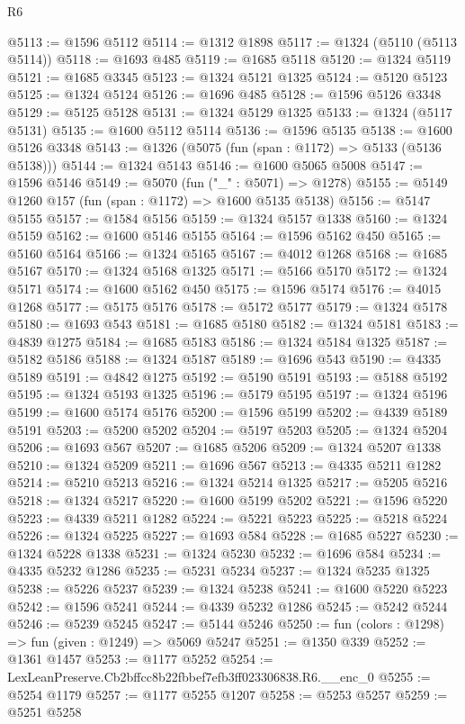 \begin{lexlean}{R6}
\begin{coremodule}
@5113 := @1596 @5112
@5114 := @1312 @1898
@5117 := @1324 (@5110 (@5113 @5114))
@5118 := @1693 @485
@5119 := @1685 @5118
@5120 := @1324 @5119
@5121 := @1685 @3345
@5123 := @1324 @5121 @1325
@5124 := @5120 @5123
@5125 := @1324 @5124
@5126 := @1696 @485
@5128 := @1596 @5126 @3348
@5129 := @5125 @5128
@5131 := @1324 @5129 @1325
@5133 := @1324 (@5117 @5131)
@5135 := @1600 @5112 @5114
@5136 := @1596 @5135
@5138 := @1600 @5126 @3348
@5143 := @1326 (@5075 (fun (span : @1172) => @5133 (@5136 @5138)))
@5144 := @1324 @5143
@5146 := @1600 @5065 @5008
@5147 := @1596 @5146
@5149 := @5070 (fun ("_" : @5071) => @1278)
@5155 := @5149 @1260 @157 (fun (span : @1172) => @1600 @5135 @5138)
@5156 := @5147 @5155
@5157 := @1584 @5156
@5159 := @1324 @5157 @1338
@5160 := @1324 @5159
@5162 := @1600 @5146 @5155
@5164 := @1596 @5162 @450
@5165 := @5160 @5164
@5166 := @1324 @5165
@5167 := @4012 @1268
@5168 := @1685 @5167
@5170 := @1324 @5168 @1325
@5171 := @5166 @5170
@5172 := @1324 @5171
@5174 := @1600 @5162 @450
@5175 := @1596 @5174
@5176 := @4015 @1268
@5177 := @5175 @5176
@5178 := @5172 @5177
@5179 := @1324 @5178
@5180 := @1693 @543
@5181 := @1685 @5180
@5182 := @1324 @5181
@5183 := @4839 @1275
@5184 := @1685 @5183
@5186 := @1324 @5184 @1325
@5187 := @5182 @5186
@5188 := @1324 @5187
@5189 := @1696 @543
@5190 := @4335 @5189
@5191 := @4842 @1275
@5192 := @5190 @5191
@5193 := @5188 @5192
@5195 := @1324 @5193 @1325
@5196 := @5179 @5195
@5197 := @1324 @5196
@5199 := @1600 @5174 @5176
@5200 := @1596 @5199
@5202 := @4339 @5189 @5191
@5203 := @5200 @5202
@5204 := @5197 @5203
@5205 := @1324 @5204
@5206 := @1693 @567
@5207 := @1685 @5206
@5209 := @1324 @5207 @1338
@5210 := @1324 @5209
@5211 := @1696 @567
@5213 := @4335 @5211 @1282
@5214 := @5210 @5213
@5216 := @1324 @5214 @1325
@5217 := @5205 @5216
@5218 := @1324 @5217
@5220 := @1600 @5199 @5202
@5221 := @1596 @5220
@5223 := @4339 @5211 @1282
@5224 := @5221 @5223
@5225 := @5218 @5224
@5226 := @1324 @5225
@5227 := @1693 @584
@5228 := @1685 @5227
@5230 := @1324 @5228 @1338
@5231 := @1324 @5230
@5232 := @1696 @584
@5234 := @4335 @5232 @1286
@5235 := @5231 @5234
@5237 := @1324 @5235 @1325
@5238 := @5226 @5237
@5239 := @1324 @5238
@5241 := @1600 @5220 @5223
@5242 := @1596 @5241
@5244 := @4339 @5232 @1286
@5245 := @5242 @5244
@5246 := @5239 @5245
@5247 := @5144 @5246
@5250 := fun (colors : @1298) => fun (given : @1249) => @5069 @5247
@5251 := @1350 @339
@5252 := @1361 @1457
@5253 := @1177 @5252
@5254 := LexLeanPreserve.Cb2bffcc8b22fbbef7efb3ff023306838.R6.__enc_0
@5255 := @5254 @1179
@5257 := @1177 @5255 @1207
@5258 := @5253 @5257
@5259 := @5251 @5258

\end{coremodule}
\end{lexlean}
